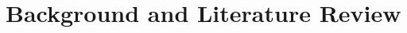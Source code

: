 \documentclass[12pt, a4paper]{article}
\begin{document}
\section{Background and Literature Review}

\pagebreak



\pagebreak
\end{document}
